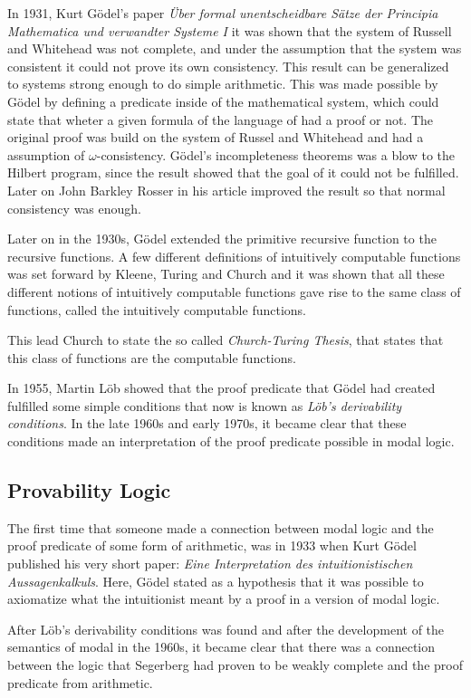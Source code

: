 \documentclass[../main.tex]{subfiles}
\begin{document}
In 1931, Kurt Gödel's paper \textit{Über formal unentscheidbare Sätze der
Principia Mathematica und verwandter Systeme I} it was shown  that the system of
Russell and Whitehead was not complete, and under the assumption that the
system was consistent it could not prove its own consistency.
This result can be generalized to systems strong enough to do simple
arithmetic. This was made possible by Gödel by defining a predicate inside of
the mathematical system, which could state that wheter a given formula of the
language of had a proof or not.
The
original proof was build on the system of Russel and Whitehead and had a
assumption of $\omega$-consistency. Gödel's incompleteness theorems
was a blow to the Hilbert program, since the result showed that the goal of it
could not be fulfilled. Later on John Barkley Rosser in his article
\citet{Ross1936} improved the
result so that normal  consistency was enough.



Later on in the 1930s, Gödel extended the primitive recursive function to the  recursive
functions. A few different definitions of intuitively computable functions was
set forward by Kleene, Turing and Church and it was shown that all these
different notions of intuitively computable functions gave rise to the same
class of functions, called the intuitively computable functions.

This lead Church to state the so called \textit{Church-Turing Thesis}, that
states that this class of functions are the computable functions.

In 1955, Martin Löb showed that the proof predicate that Gödel had created
fulfilled some simple conditions that now is known as \textit{Löb's derivability
conditions}. In the late 1960s and early 1970s, it became clear that these
conditions made an interpretation of the proof predicate possible in modal
logic.


\subsection{Provability Logic}
The first time that someone made a connection between modal logic and the proof
predicate of some form of arithmetic, was in 1933 when Kurt Gödel published his very short  paper:
\textit{Eine
Interpretation des intuitionistischen Aussagenkalkuls}. Here, Gödel
stated as a  hypothesis that it was possible to axiomatize what the
intuitionist meant by a proof in a version of modal logic.

After Löb's derivability conditions was found and after the development of the
semantics of modal in the 1960s, it became clear that there was a connection
between the logic that Segerberg had proven to be weakly complete and the proof
predicate from arithmetic.
\end{document}
